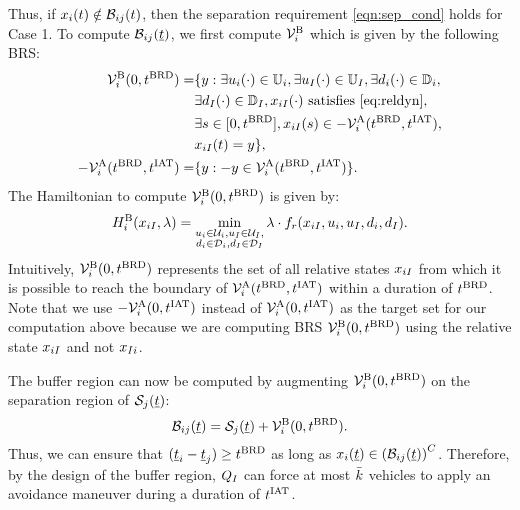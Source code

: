 Thus, if $x_i(t) \notin \mathcal{B}_{ij}(t)$, then the separation requirement \eqref{eqn:sep_cond} holds for Case 1. To compute $\mathcal{B}_{ij}(\underline{t})$, we first compute $\mathcal{V}^{\text{B}}_{i}$ which is given by the following BRS:
\begin{equation} \label{eqn:buffBRS_case1}
\begin{aligned}
\brs^{\text{B}}_{i}(0, \brd) = & \{y: \exists \ctrl_i(\cdot) \in \cfset_i, \exists \ctrl_\intr(\cdot) \in \cfset_\intr, \exists \dstb_i(\cdot) \in \dfset_i, \\
& \exists \dstb_\intr(\cdot) \in \dfset_\intr, \state_{i \intr}(\cdot) \text{ satisfies \eqref{eq:reldyn}},\\
& \exists s \in [0, \brd], \state_{i \intr}(s) \in -\brs^{\text{A}}_{i}(\brd, \iat),\\
& \state_{i \intr}(t) = y\},\\
-\brs^{\text{A}}_{i}(\brd, \iat) = & \{y: -y \in \brs^{\text{A}}_{i}(\brd, \iat) \}.
\end{aligned}
\end{equation}
The Hamiltonian to compute $\mathcal{V}^{\text{B}}_{i}(0, t^\text{BRD})$ is given by:
\begin{equation} 
H^{\text{B}}_{i}(x_{i I}, \lambda) = \min_{\substack{u_i \in \mathcal{U}_i, u_I \in \mathcal{U}_I, \\ d_i \in \mathcal{D}_i, d_I \in \mathcal{D}_I}} \lambda \cdot f_r(x_{i I}, u_i, u_I, d_i, d_I).
\end{equation}
Intuitively, $\mathcal{V}^{\text{B}}_{i}(0, t^\text{BRD})$ represents the set of all relative states $x_{i I}$ from which it is possible to reach the boundary of $\mathcal{V}^{\text{A}}_{i}(t^\text{BRD}, t^\text{IAT})$ within a duration of $t^\text{BRD}$. Note that we use $-\mathcal{V}^{\text{A}}_{i}(0, t^\text{IAT})$ instead of $\mathcal{V}^{\text{A}}_{i}(0, t^\text{IAT})$ as the target set for our computation above because we are computing BRS $\mathcal{V}^{\text{B}}_{i}(0, t^\text{BRD})$ using the relative state $x_{i I}$ and not $x_{I i}$.  %

The buffer region can now be computed by augmenting $\mathcal{V}^{\text{B}}_{i}(0, t^\text{BRD})$ on the separation region of $\mathcal{S}_j(\underline{t})$:
\begin{equation} \label{eqn:buffRegion_case1}
\buff_{ij}(\tsa) = \sep_j(\tsa) + \brs^{\text{B}}_{i}(0, \brd).
\end{equation} 
Thus, we can ensure that $(\underline{t}_i - \underline{t}_j) \geq t^\text{BRD}$ as long as $x_i(\underline{t}) \in \left(\mathcal{B}_{ij}(\underline{t})\right)^C$. Therefore, by the design of the buffer region, $Q_{I}$ can force at most $\bar{k}$ vehicles to apply an avoidance maneuver during a duration of $t^\text{IAT}$.